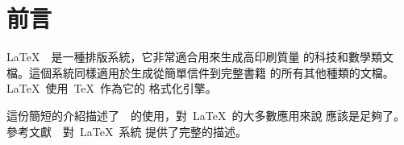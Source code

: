 

\chapter{前言}

\LaTeX{}~\cite{manual}~是一種排版系統，它非常適合用來生成高印刷質量
的科技和數學類文檔。這個系統同樣適用於生成從簡單信件到完整書籍
的所有其他種類的文檔。\LaTeX~使用~\TeX{}\cite{texbook}~作為它的
格式化引擎。%

這份簡短的介紹描述了~\LaTeXe{}~的使用，對~\LaTeX{}~的大多數應用來說
應該是足夠了。參考文獻~\cite{manual,companion}~對~\LaTeX{}~系統
提供了完整的描述。%

